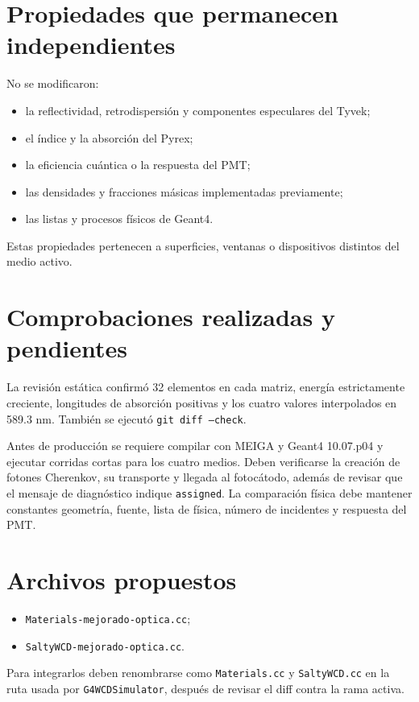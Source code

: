 \documentclass[11pt,a4paper]{article}
\newcommand{\codigo}[1]{\texttt{#1}}
\begin{document}
\section{Propiedades que permanecen independientes}
No se modificaron:
\begin{itemize}
\item la reflectividad, retrodispersión y componentes especulares del Tyvek;
\item el índice y la absorción del Pyrex;
\item la eficiencia cuántica o la respuesta del PMT;
\item las densidades y fracciones másicas implementadas previamente;
\item las listas y procesos físicos de Geant4.
\end{itemize}
Estas propiedades pertenecen a superficies, ventanas o dispositivos distintos
del medio activo.

\section{Comprobaciones realizadas y pendientes}
La revisión estática confirmó 32 elementos en cada matriz, energía estrictamente
creciente, longitudes de absorción positivas y los cuatro valores interpolados
en 589.3 nm. También se ejecutó \codigo{git diff --check}.

Antes de producción se requiere compilar con MEIGA y Geant4 10.07.p04 y ejecutar
corridas cortas para los cuatro medios. Deben verificarse la creación de
fotones Cherenkov, su transporte y llegada al fotocátodo, además de revisar que
el mensaje de diagnóstico indique \codigo{assigned}. La comparación física
debe mantener constantes geometría, fuente, lista de física, número de
incidentes y respuesta del PMT.

\section{Archivos propuestos}
\begin{itemize}
\item \codigo{Materials-mejorado-optica.cc};
\item \codigo{SaltyWCD-mejorado-optica.cc}.
\end{itemize}
Para integrarlos deben renombrarse como \codigo{Materials.cc} y
\codigo{SaltyWCD.cc} en la ruta usada por \codigo{G4WCDSimulator}, después de
revisar el diff contra la rama activa.
\end{document}
